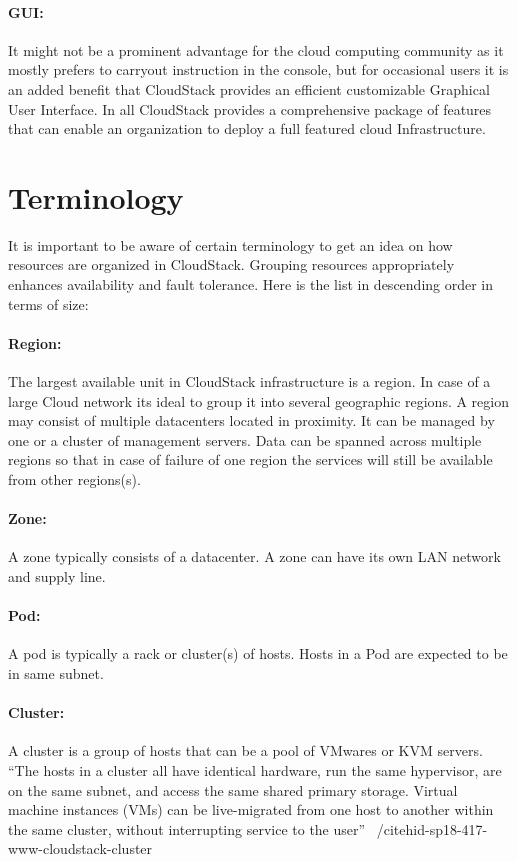 \paragraph{GUI:} It might not be a prominent advantage for the cloud
computing community as it mostly prefers to carryout instruction in
the console, but for occasional users it is an added benefit that
CloudStack provides an efficient customizable Graphical User
Interface. In all CloudStack provides a comprehensive package of
features that can enable an organization to deploy a full featured
cloud Infrastructure.

\section{Terminology}

It is important to be aware of certain terminology to get an idea on
how resources are organized in CloudStack. Grouping resources 
appropriately enhances availability and fault tolerance. Here is the 
list in descending order in terms of size:
\paragraph{Region:}	The largest available unit in CloudStack infrastructure is a 
region. In case of a large Cloud network its ideal to group it into 
several geographic regions. A region may consist of multiple datacenters
located in proximity. It can be managed by one or a cluster of management
servers. Data can be spanned across multiple regions so that in case of
failure of one region the services will still be available from other regions(s).
\paragraph{Zone:}	A zone typically consists of a datacenter. A zone can have its own LAN
network and supply line. 
\paragraph{Pod:}	A pod is typically a rack or cluster(s) of hosts. Hosts in a Pod are 
expected to be in same subnet. 
\paragraph{Cluster:} 	A cluster is a group of hosts that can be a pool of VMwares or KVM 
servers. ``The hosts in a cluster all have identical hardware, run the same 
hypervisor, are on the same subnet, and access the same shared primary storage.
Virtual machine instances (VMs) can be live-migrated from one host to another
within the same cluster, without interrupting service to the user''
~/cite{hid-sp18-417-www-cloudstack-cluster}
